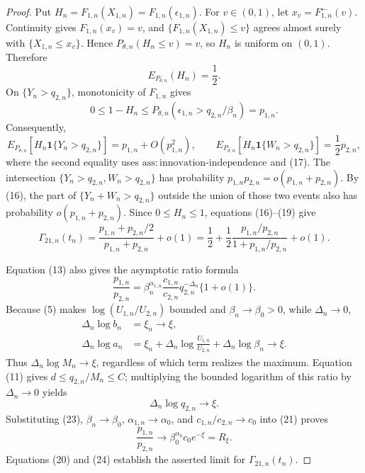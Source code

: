 \documentclass{article}
\begin{document}
\begin{proof}
Put \(H_n=F_{1,n}(X_{1,n})=F_{1,n}(\epsilon_{1,n})\). For \(v\in(0,1)\), let \(x_v=F_{1,n}^{\leftarrow}(v)\). Continuity gives \(F_{1,n}(x_v)=v\), and \(\{F_{1,n}(X_{1,n})\leq v\}\) agrees almost surely with \(\{X_{1,n}\leq x_v\}\). Hence \(P_{\theta,n}(H_n\leq v)=v\), so \(H_n\) is uniform on \((0,1)\). Therefore
\[
E_{P_{\theta,n}}(H_n)=\frac12.
\tag{17}
\]
On \(\{Y_n>q_{2,n}\}\), monotonicity of \(F_{1,n}\) gives
\[
0\leq1-H_n
\leq P_{\theta,n}(\epsilon_{1,n}>q_{2,n}/\beta_n)=p_{1,n}.
\tag{18}
\]
Consequently,
\[
E_{P_{\theta,n}}[H_n\mathbf 1\{Y_n>q_{2,n}\}]
=p_{1,n}+O(p_{1,n}^2),
\qquad
E_{P_{\theta,n}}[H_n\mathbf 1\{W_n>q_{2,n}\}]
=\frac12p_{2,n},
\tag{19}
\]
where the second equality uses \(\mathrm{ass{:}innovation\text{-}independence}\) and (17). The intersection \(\{Y_n>q_{2,n},W_n>q_{2,n}\}\) has probability \(p_{1,n}p_{2,n}=o(p_{1,n}+p_{2,n})\). By (16), the part of \(\{Y_n+W_n>q_{2,n}\}\) outside the union of those two events also has probability \(o(p_{1,n}+p_{2,n})\). Since \(0\leq H_n\leq1\), equations (16)--(19) give
\[
\Gamma_{21,n}(t_n)
=\frac{p_{1,n}+p_{2,n}/2}{p_{1,n}+p_{2,n}}+o(1)
=\frac12+\frac12\frac{p_{1,n}/p_{2,n}}{1+p_{1,n}/p_{2,n}}+o(1).
\tag{20}
\]

Equation (13) also gives the asymptotic ratio formula
\[
\frac{p_{1,n}}{p_{2,n}}
=\beta_n^{\alpha_{1,n}}\frac{c_{1,n}}{c_{2,n}}
q_{2,n}^{-\Delta_n}\{1+o(1)\}.
\tag{21}
\]
Because (5) makes \(\log(U_{1,n}/U_{2,n})\) bounded and \(\beta_n\to\beta_0>0\), while \(\Delta_n\to0\),
\[
\begin{aligned}
\Delta_n\log b_n&=\xi_n\longrightarrow\xi,\\
\Delta_n\log a_n
&=\xi_n+\Delta_n\log\frac{U_{1,n}}{U_{2,n}}
+\Delta_n\log\beta_n\longrightarrow\xi.
\end{aligned}
\tag{22}
\]
Thus \(\Delta_n\log M_n\to\xi\), regardless of which term realizes the maximum. Equation (11) gives \(d\leq q_{2,n}/M_n\leq C\); multiplying the bounded logarithm of this ratio by \(\Delta_n\to0\) yields
\[
\Delta_n\log q_{2,n}\longrightarrow\xi.
\tag{23}
\]
Substituting (23), \(\beta_n\to\beta_0\), \(\alpha_{1,n}\to\alpha_0\), and \(c_{1,n}/c_{2,n}\to c_0\) into (21) proves
\[
\frac{p_{1,n}}{p_{2,n}}
\longrightarrow
\beta_0^{\alpha_0}c_0e^{-\xi}=R_\xi.
\tag{24}
\]
Equations (20) and (24) establish the asserted limit for \(\Gamma_{21,n}(t_n)\).


\end{proof}
\end{document}
